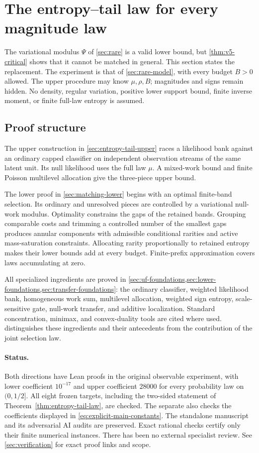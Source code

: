 \section{The entropy--tail law for every magnitude law}\label{sec:entropy-tail}
The variational modulus $\Psi$ of \cref{sec:rare} is a valid lower
bound, but \cref{thm:v5-critical} shows that it cannot be matched in
general. This section states the replacement. The experiment is that of
\cref{sec:rare-model}, with every budget $B>0$ allowed. The upper
procedure may know $\mu,\rho,B$; magnitudes and signs remain hidden. No
density, regular variation, positive lower support bound, finite inverse
moment, or finite full-law entropy is assumed.



\subsection{Proof structure}
The upper construction in \cref{sec:entropy-tail-upper} races a
likelihood bank against an ordinary capped classifier on independent
observation streams of the same latent unit. Its null likelihood uses
the full law $\mu$. A mixed-work bound and finite Poisson multilevel
allocation give the three-piece upper bound.

The lower proof in \cref{sec:matching-lower} begins with an optimal
finite-band selection. Its ordinary and unresolved pieces are controlled
by a variational null-work modulus. Optimality constrains the gaps of
the retained bands. Grouping comparable costs and trimming a controlled
number of the smallest gaps produces annular components with admissible
conditional rarities and active mass-saturation constraints. Allocating
rarity proportionally to retained entropy makes their lower bounds add
at every budget. Finite-prefix approximation covers laws accumulating
at zero.

All specialized ingredients are proved in
\cref{sec:uf-foundations,sec:lower-foundations,sec:transfer-foundations}:
the ordinary classifier, weighted likelihood bank, homogeneous work sum,
multilevel allocation, weighted sign entropy, scale-sensitive gate,
null-work transfer, and additive localization. Standard concentration,
minimax, and convex-duality tools are cited where used.
 distinguishes these ingredients and their
antecedents from the contribution of the joint selection law.

\paragraph{Status.}
Both directions have Lean proofs in the original observable experiment,
with lower coefficient $10^{-17}$ and upper coefficient $28000$ for every
probability law on $(0,1/2]$. All eight frozen targets, including the
two-sided statement of Theorem~\ref{thm:entropy-tail-law}, are checked.
The separate  also checks the
coefficients displayed in \eqref{eq:explicit-main-constants}.
The standalone manuscript and its adversarial AI audits are preserved.
Exact rational checks certify only their finite numerical instances.
There has been no external specialist review. See \cref{sec:verification}
for exact proof links and scope.
